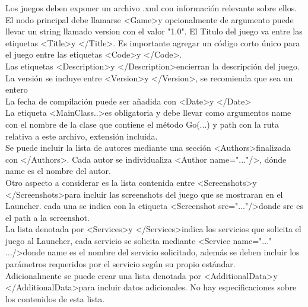 \documentclass[language=spanish]{article}
\begin{document}
Los juegos deben exponer un archivo .xml con información relevante sobre ellos.
El nodo principal debe llamarse \textless Game\textgreater y opcionalmente de argumento puede llevar un string llamado version con el valor "1.0".
El Titulo del juego va entre las etiquetas \textless Title\textgreater y \textless /Title\textgreater. Es importante agregar un código corto único para el juego entre las etiquetas \textless Code\textgreater y \textless /Code\textgreater.\\
Las etiquetas \textless Description\textgreater y \textless /Description\textgreater encierran la descripción del juego.\\
La versión se incluye entre \textless Version\textgreater y \textless /Version\textgreater , se recomienda que sea un entero\\
La fecha de compilación puede ser añadida con \textless Date\textgreater  y \textless /Date\textgreater \\
La etiqueta \textless MainClass..\textgreater  es obligatoria y debe llevar como argumentos name con el nombre de la clase que contiene el método Go(...) y path con la ruta relativa a este archivo, extensión incluida.\\
Se puede incluir la lista de autores mediante una sección \textless Authors\textgreater  finalizada con \textless /Authors\textgreater . Cada autor se individualiza \textless Author name="..."/\textgreater , dónde name es el nombre del autor.\\
Otro aspecto a considerar es la lista contenida entre \textless Screenshots\textgreater  y \textless /Screenshots\textgreater  para incluir las screenshots del juego que se mostraran en el Launcher. cada una se indica con la etiqueta \textless Screenshot src="..."/\textgreater  donde src es el path a la screenshot.\\
La lista denotada por \textless Services\textgreater y \textless /Services\textgreater  indica los servicios que solicita el juego al Launcher, cada servicio se solicita mediante \textless Service name="..." .../\textgreater  donde name es el nombre del servicio solicitado, además se deben incluir los parámetros requeridos por el servicio según su propio estándar.\\
Adicionalmente se puede crear una lista denotada por \textless AdditionalData\textgreater  y \textless /AdditionalData\textgreater  para incluir datos adicionales. No hay especificaciones sobre los contenidos de esta lista.\\ 
\end{document}
